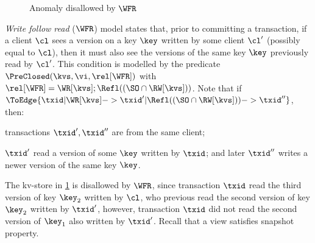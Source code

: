 \begin{figure}
\centering
{}

\hrulefill

\caption{Anomaly disallowed by \(\WFR\)}
\label{fig:wfr-disallowed}
\end{figure}

\emph{Write follow read} (\(\WFR \)) \citep{session-guarantee,repldatatypes} model states that, prior to committing a transaction, 
if a client \(\cl\) sees a version on a key \(\key\) written by some client \(\cl'\) (possibly equal to \(\cl\)), 
then it must also see the versions of the same key \(\key\) previously read by \(\cl'\). 
This condition is modelled by the predicate \( \PreClosed(\kvs,\vi,\rel[\WFR]) \)
with \( \rel[\WFR] = \WR[\kvs] ; \Refl((\SO \cap \RW[\kvs]))\).
Note that if \( \ToEdge{\txid | \WR[\kvs] -> \txid' | \Refl((\SO \cap \RW[\kvs])) -> \txid'' } \),
then:
\begin{enumerate*}
\item transactions \( \txid',\txid'' \) are from the same client;
\item \( \txid' \) read a version of some \( \key \) written by \( \txid \);
and later \( \txid'' \) writes a newer version of the same key \( \key \).
\end{enumerate*}
The kv-store in \cref{fig:wfr-disallowed} is disallowed by \(\WFR\),
since transaction \(\txid\) read the third version of key \( \key_2 \) written by \(\cl\),
who previous read the second version of key \(\key_2 \) written by \( \txid' \),
however, transaction \(\txid\) did not read the second version of \( \key_1 \) also written by \( \txid' \).
Recall that a view satisfies snapshot property.

